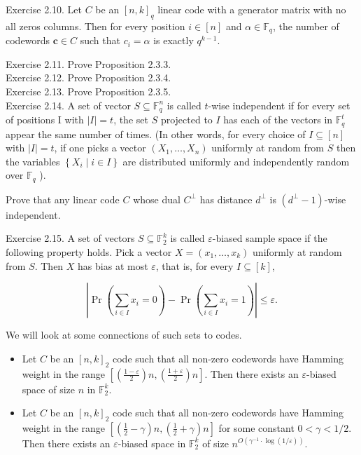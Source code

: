 \documentclass[10pt]{article}
\begin{document}
Exercise 2.10. Let $C$ be an $[n, k]_{q}$ linear code with a generator matrix with no all zeros columns. Then for every position $i \in[n]$ and $\alpha \in \mathbb{F}_{q}$, the number of codewords $\mathbf{c} \in C$ such that $c_{i}=\alpha$ is exactly $q^{k-1}$.

Exercise 2.11. Prove Proposition 2.3.3.\\
Exercise 2.12. Prove Proposition 2.3.4.\\
Exercise 2.13. Prove Proposition 2.3.5.\\
Exercise 2.14. A set of vector $S \subseteq \mathbb{F}_{q}^{n}$ is called $t$-wise independent if for every set of positions I with $|I|=t$, the set $S$ projected to $I$ has each of the vectors in $\mathbb{F}_{q}^{t}$ appear the same number of times. (In other words, for every choice of $I \subseteq[n]$ with $|I|=t$, if one picks a vector $\left(X_{1}, \ldots, X_{n}\right)$ uniformly at random from $S$ then the variables $\left\{X_{i} \mid i \in I\right\}$ are distributed uniformly and independently random over $\mathbb{F}_{q}$ ).

Prove that any linear code $C$ whose dual $C^{\perp}$ has distance $d^{\perp}$ is $\left(d^{\perp}-1\right)$-wise independent.

Exercise 2.15. A set of vectors $S \subseteq \mathbb{F}_{2}^{k}$ is called $\varepsilon$-biased sample space if the following property holds. Pick a vector $X=\left(x_{1}, \ldots, x_{k}\right)$ uniformly at random from $S$. Then $X$ has bias at most $\varepsilon$, that is, for every $I \subseteq[k]$,

$$
\left|\operatorname{Pr}\left(\sum_{i \in I} x_{i}=0\right)-\operatorname{Pr}\left(\sum_{i \in I} x_{i}=1\right)\right| \leq \varepsilon .
$$

We will look at some connections of such sets to codes.

\begin{itemize}
  \item[1.] Let $C$ be an $[n, k]_{2}$ code such that all non-zero codewords have Hamming weight in the range $\left[\left(\frac{1-\varepsilon}{2}\right) n,\left(\frac{1+\varepsilon}{2}\right) n\right]$. Then there exists an $\varepsilon$-biased space of size $n$ in $\mathbb{F}_{2}^{k}$.
  \item[2.] Let $C$ be an $[n, k]_{2}$ code such that all non-zero codewords have Hamming weight in the range $\left[\left(\frac{1}{2}-\gamma\right) n,\left(\frac{1}{2}+\gamma\right) n\right]$ for some constant $0<\gamma<1 / 2$. Then there exists an $\varepsilon$-biased space in $\mathbb{F}_{2}^{k}$ of size $n^{O\left(\gamma^{-1} \cdot \log (1 / \varepsilon)\right)}$.
\end{itemize}
\end{document}
